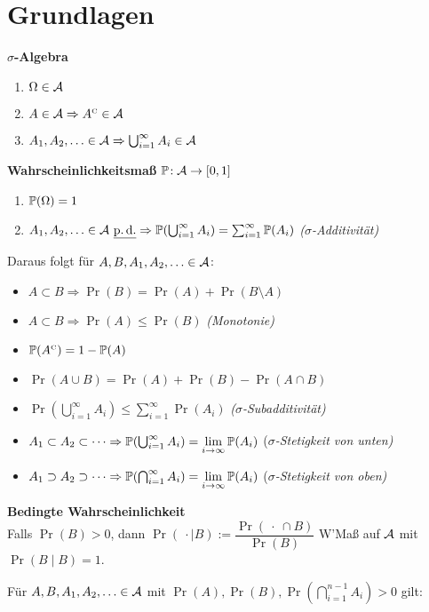 \section{Grundlagen}

\textbf{$\sigma$-Algebra}
\begin{enumerate}
\item $\Omega\in\mathcal{A}$
\item $A\in\mathcal{A} \Rightarrow A^{\text{\tiny C}}\in\mathcal{A}$
\item $A_1,A_2,\ldots\in\mathcal{A} \Rightarrow \bigcup_{i=1}^{\infty} A_i \in\mathcal{A}$
\end{enumerate}

\textbf{Wahrscheinlichkeitsmaß} $\mathbb{P}\!: \mathcal{A} \rightarrow [0,1]$
\begin{enumerate}
\item $\mathbb{P}(\Omega) = 1$
\item $A_1,A_2,\ldots\in\mathcal{A}\ \underline{\operatorname{p.d.}} \Rightarrow
  \mathbb{P}(\bigcup_{i=1}^{\infty} A_i) = \sum_{i=1}^{\infty} \mathbb{P}(A_i)$
  \hfill\textit{($\sigma$-Additivität)}
\end{enumerate}

Daraus folgt für $A,B,A_1,A_2,\ldots\in\mathcal{A}$:
\begin{itemize}
\item $A \subset B \Rightarrow \Pr(B) = \Pr(A) + \Pr(B \setminus A)$
\item $A \subset B \Rightarrow \Pr(A) \leq \Pr(B)$ \hfill\textit{(Monotonie)}
\item $\mathbb{P}(A^{\text{\tiny C}}) = 1 - \mathbb{P}(A)$
\item $\Pr(A \cup B) = \Pr(A) + \Pr(B) - \Pr(A \cap B)$
\item $\Pr(\bigcup_{i=1}^{\infty} A_i) \leq \sum_{i=1}^{\infty} \Pr(A_i)$
  \hfill\textit{($\sigma$-Subadditivität)}
\item $A_1 \subset A_2 \subset \cdots \Rightarrow
  \mathbb{P}(\bigcup_{i=1}^{\infty} A_i) = \lim\limits_{i\to\infty} \mathbb{P}(A_i)$
  \hfill(\textit{$\sigma$-Stetigkeit von unten)}
\item $A_1 \supset A_2 \supset \cdots \Rightarrow
  \mathbb{P}(\bigcap_{i=1}^{\infty} A_i) = \lim\limits_{i\to\infty} \mathbb{P}(A_i)$
  \hfill(\textit{$\sigma$-Stetigkeit von oben)}
\end{itemize}

\textbf{Bedingte Wahrscheinlichkeit}\\
Falls $\Pr(B) > 0$, dann
$\Pr(\ \cdot \mid B) := \dfrac{\Pr(\ \cdot\ \cap B)}{\Pr(B)}$
W'Maß auf $\mathcal{A}$ mit $\Pr(B \mid B) = 1$.

Für $A,B,A_1,A_2,\ldots\in\mathcal{A}$ mit
$\Pr(A),\Pr(B), \Pr(\bigcap_{i=1}^{n-1} A_i) > 0$ gilt:

